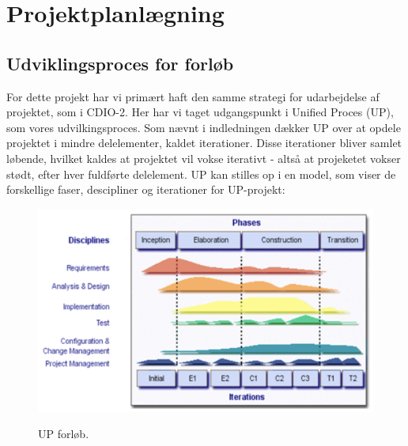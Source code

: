 \documentclass[../main.tex]{subfiles}
\begin{document}
\section{Projektplanlægning}

\subsection{Udviklingsproces for forløb}
\begin{flushleft}
 \newline
   For dette projekt har vi primært haft den samme strategi for udarbejdelse af projektet, som i CDIO-2. Her har vi taget udgangspunkt i Unified Proces (UP), som vores udvilkingsproces. Som nævnt i indledningen dækker UP over at opdele projektet i mindre delelementer, kaldet iterationer. Disse iterationer bliver samlet løbende, hvilket kaldes at projektet vil vokse iterativt - altså at projeketet vokser stødt, efter hver fuldførte delelement. UP kan stilles op i en model, som viser de forskellige faser, descipliner og iterationer for UP-projekt:
\end{flushleft}

\begin{figure}[H]
    \begin{center}
   {\includegraphics[width=0.45\textheight]{figures/UP-model.png}}
    \caption{UP forløb. \cite{UPModel} }
    
    \end{center}
\end{figure}



\end{document}

